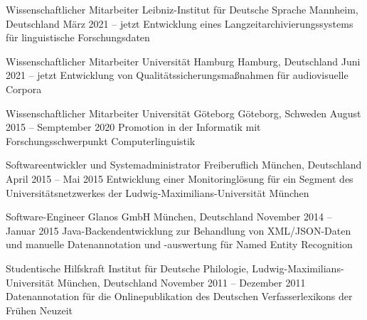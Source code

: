 \documentclass[11pt, a4]{academic-cv}
\begin{document}
\begin{cventries}
\cventry
{Wissenschaftlicher Mitarbeiter} %
{ Leibniz-Institut für Deutsche Sprache} %
{Mannheim, Deutschland} %
{März 2021 -- jetzt} %
{
Entwicklung eines Langzeitarchivierungssystems für linguistische Forschungsdaten
}

\cventry
{Wissenschaftlicher Mitarbeiter} %
{ Universität Hamburg} %
{Hamburg, Deutschland} %
{Juni 2021 -- jetzt} %
{
Entwicklung von Qualitätssicherungsmaßnahmen für audiovisuelle Corpora
}

\cventry
{Wissenschaftlicher Mitarbeiter} %
{ Universität Göteborg} %
{Göteborg, Schweden} %
{August 2015 -- Semptember 2020} %
{
Promotion in der Informatik mit Forschungsschwerpunkt Computerlinguistik
}

\cventry
{Softwareentwickler und Systemadministrator} %
{Freiberuflich} %
{München, Deutschland} %
{April 2015 -- Mai 2015} %
{
Entwicklung einer Monitoringlösung für ein Segment des Universitätsnetzwerkes der Ludwig-Maximilians-Universität München
}

\cventry
{Software-Engineer} %
{ Glanos GmbH} %
{München, Deutschland} %
{November 2014 -- Januar 2015} %
{
Java-Backendentwicklung zur Behandlung von XML/JSON-Daten und manuelle Datenannotation und -auswertung für Named Entity Recognition
}

\cventry
{Studentische Hilfskraft} %
{ Institut für Deutsche Philologie, Ludwig-Maximilians-Universität} %
{München, Deutschland} %
{November 2011 -- Dezember 2011} %
{
Datenannotation für die Onlinepublikation des Deutschen Verfasserlexikons der Frühen Neuzeit
}


\end{cventries}
\end{document}
